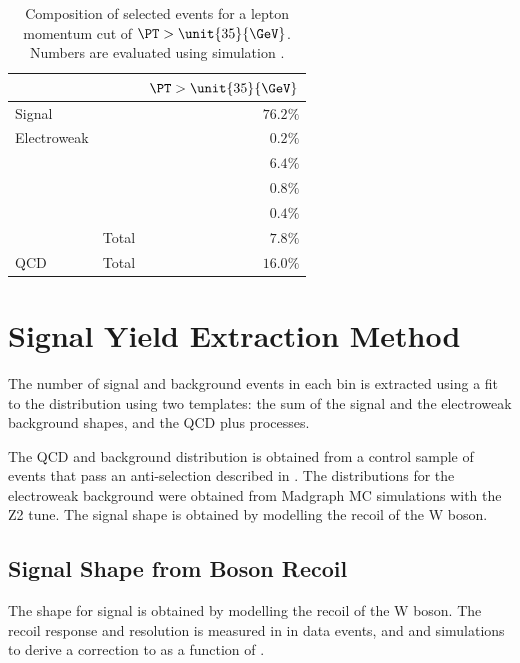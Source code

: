 \begin{table}[htbp]
\begin{center}
\begin{tabular}{llr}
    \toprule
& & $\PT>\unit{35}{\GeV}$\\
\midrule
Signal & \HepProcess{\PW\to\Pe\Pnu} & $76.2\%$ \\
Electroweak & \HepProcess{\PZ\to\Ptau\Ptau} & $0.2\%$  \\
    & \HepProcess{\PZ\to\Pe\Pe}     & $6.4\%$  \\
    & \HepProcess{\PW\to\Ptau\Pnu}  & $0.8\%$  \\
    & \HepProcess{\Ptop\APtop}      & $0.4\%$  \\
    & Total                         & $7.8\%$  \\
QCD & Total                         & $16.0\%$ \\
\bottomrule
\end{tabular}
\caption[Composition of selected events for a lepton momentum cut of
$\PT>\unit{35}{\GeV}$.] {Composition of selected events for a lepton momentum
cut of $\PT>\unit{35}{\GeV}$. Numbers are evaluated using simulation
\cite{bendavid2011electron}.}
\label{tab:updatedselectedcomp}
\end{center}
\end{table}

\section{Signal Yield Extraction Method}
The number of signal and background events in each bin is extracted using a fit
to the \ETm distribution using two templates: the sum of the \Wenu signal and
the {electroweak} background shapes, and the {QCD} plus \gjet processes.

The {QCD} and \gjet background distribution is obtained from a control sample of
events that pass an anti-selection described in .  The
\ETm distributions for the {electroweak} background were obtained from Madgraph
{MC} simulations with the Z2 tune.  The signal \ETm shape is
obtained by modelling the recoil of the W boson. 

\subsection{Signal \ETm Shape from Boson Recoil}
The \ETm shape for signal is obtained by modelling the recoil of the W boson.  The
recoil response and resolution is measured in in \HepProcess{\PZ\to\Pe\Pe} data
events, and \PW and  simulations to derive a correction to \ETm as a
function of \PW \pT \cite{bauer2010modeling,alcaraz2010updated}.

